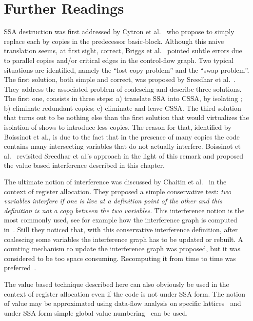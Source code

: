 \section{Further Readings}
SSA destruction was first addressed by Cytron et al.~\cite{CFR+91} who propose to simply replace each \phifun by copies in the predecessor basic-block. Although this naive translation seems, at first sight, correct, Briggs et
al.~\cite{BriggsSSA} pointed subtle errors due to parallel copies and/or
critical edges in the control-flow graph. Two typical situations are
identified, namely the ``lost copy problem'' and the ``swap problem''.
The first solution, both simple and correct, was proposed by Sreedhar et al.~\cite{VC+99}. They address the associated problem of coalescing and describe three solutions. 
The first one, consists in three
steps: a) translate SSA into CSSA, by isolating \phifuns; b)
eliminate redundant copies; c) eliminate \phifuns and leave CSSA.
The third solution that turns out to be nothing else than the first solution that would virtualizes the isolation of \phifuns shows to introduce less copies. The reason for that, identified by Boissinot et al., is due to the fact that in the presence of many copies the code contains many intersecting variables that do not actually interfere. Boissinot et al.~\cite{Boissinot09} revisited Sreedhar et al.'s approach in the light of this remark and proposed the value based interference described in this chapter.

The ultimate notion of interference was discussed by Chaitin et al.~\cite{Chaitin81} in the context of register allocation. 
They proposed a simple conservative test: \emph{two variables interfere if
  one is live at a definition point of the other and this definition is not a
  copy between the two variables}. This interference notion is the most
commonly used, see for example how the interference graph is computed
in~\cite{appel:2002:modern}. Still they noticed that, with this conservative interference definition,
after coalescing some variables the interference graph has to be updated or rebuilt. 
A counting mechanism to update the interference graph was proposed,  but it was considered to be
too space consuming. Recomputing it from time to time was preferred~\cite{Chaitin81,Chaitin82}.

The value based technique described here can also obviously be used in the context of register allocation even if the code is not under SSA form. The notion of value may be approximated using data-flow analysis on specific lattices~\cite{AlpernWZ88} and under SSA form simple global value numbering~\cite{Rosen88} can be used.

